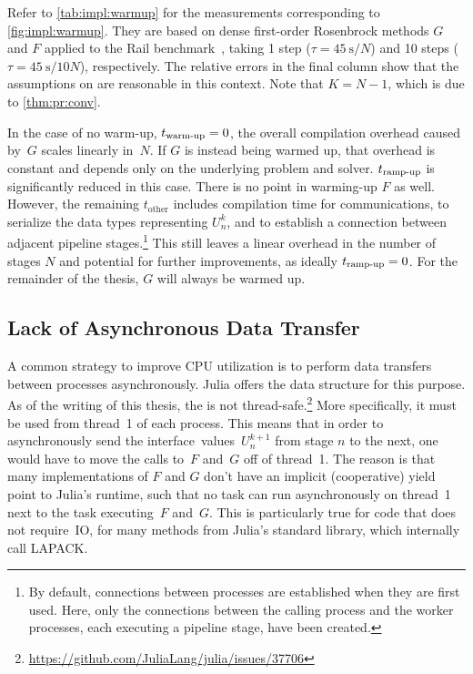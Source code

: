 Refer to \autoref{tab:impl:warmup} for the measurements corresponding to \autoref{fig:impl:warmup}.
They are based on dense first-order Rosenbrock methods $G$ and $F$ applied to the Rail benchmark~\cite{morwiki_steel},
taking 1 step ($\tau=\SI{45}{\second}/N$) and 10 steps ($\tau=\SI{45}{\second}/10N$), respectively.
The relative errors in the final column show that the assumptions on  are reasonable in this context.
Note that $K=N-1$, which is due to \autoref{thm:pr:conv}.

In the case of no warm-up, $t_\text{warm-up}=0$, the overall compilation overhead caused by~$G$ scales linearly in~$N$.
If $G$ is instead being warmed up,
that overhead is constant and depends only on the underlying problem and solver.
$t_\text{ramp-up}$ is significantly reduced in this case.
There is no point in warming-up $F$ as well.
However, the remaining $t_\text{other}$ includes compilation time for communications,
\eg to serialize the data types representing $U_n^k$,
and to establish a connection between adjacent pipeline stages.\footnote{%
  By default, connections between processes are established when they are first used.
  Here, only the connections between the calling process and the worker processes,
  each executing a pipeline stage,
  have been created.
}
This still leaves a linear overhead in the number of stages $N$
and potential for further improvements,
as ideally $t_\text{ramp-up}=0$.
For the remainder of the thesis, $G$ will always be warmed up.

\subsection{Lack of Asynchronous Data Transfer}
\label{sec:impl:pr:sync}

A common strategy to improve CPU utilization is to perform data transfers between processes asynchronously.
Julia offers the  data structure for this purpose.
As of the writing of this thesis,
the  is not thread-safe.\footnote{\url{https://github.com/JuliaLang/julia/issues/37706}}
More specifically, it must be used from thread~1 of each process.
This means that in order to asynchronously send the interface~values~$U_n^{k+1}$ from stage $n$ to the next,
one would have to move the calls to~$F$ and~$G$ off of thread~1.
The reason is that many implementations of $F$ and $G$ don't have an implicit (cooperative) yield point to Julia's runtime,
such that no task can run asynchronously on thread~1 next to the task executing~$F$ and~$G$.
This is particularly true for code that does not require~\ac{IO},
\eg for many methods from Julia's  standard library,
which internally call LAPACK.

